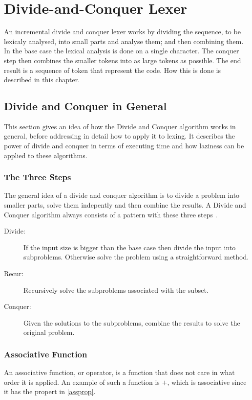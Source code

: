 \chapter{Divide-and-Conquer Lexer}
An incremental divide and conquer lexer works by dividing the sequence, to be
lexicaly analysed, into small parts and analyse them; and then combining them.
In the base case the lexical analysis is done on a single character. The
conquer step then combines the smaller tokens into as large tokens as possible.
The end result is a sequence of token that represent the code. How this is done
is described in this chapter.

\section{Divide and Conquer in General}
This section gives an idea of how the Divide and Conquer algorithm
works in general, before addressing in detail how to apply it to lexing. It
describes the power of divide and conquer in terms of executing time and how
laziness can be applied to these algorithms.

\subsection{The Three Steps}
The general idea of a divide and conquer algorithm is to divide a problem into
smaller parts, solve them indepently and then combine the results. A Divide
and Conquer algorithm always consists of a pattern with these three steps
\cite{Goodrich}.
\begin{description}
\item[Divide:] If the input size is bigger than the base case then divide the
input into subproblems. Otherwise solve the problem using a straightforward
method.
\item[Recur:] Recursively solve the subproblems associated with the subset.
\item[Conquer:] Given the solutions to the subproblems, combine the results to
solve the original problem.
\end{description}

\subsection{Associative Function}
An associative function, or operator, is a function that does not care in what
order it is applied. An example of such a function is $+$, which is associative
since it has the propert in \cref{assprop}.

